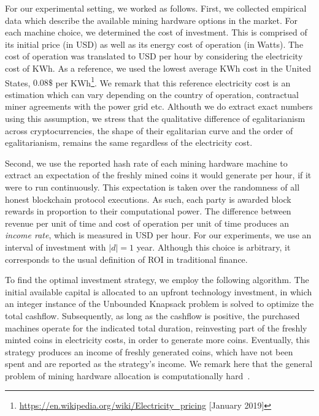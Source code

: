 For our experimental setting, we worked as follows. First, we collected
empirical data which describe the available mining hardware options in the
market. For each machine choice, we determined the cost of investment. This is
comprised of its initial price (in USD) as well as its energy cost of operation
(in Watts). The cost of operation was translated to USD per hour by considering
the electricity cost of KWh. As a reference, we used the lowest average KWh
cost in the United States, \ie $0.08\$$ per KWh\footnote{
\url{https://en.wikipedia.org/wiki/Electricity_pricing} [January
2019]}. We remark that this reference electricity cost is an estimation which
can vary depending on the country of operation, contractual miner agreements
with the power grid etc. Althouth we do extract exact numbers using this
assumption, we stress that the qualitative difference of egalitarianism across
cryptocurrencies, \ie the shape of their egalitarian curve and the order of
egalitarianism, remains the same regardless of the electricity cost.

Second, we use the reported hash rate of each mining hardware machine to
extract an expectation of the freshly mined coins it would generate per hour,
if it were to run continuously. This expectation is taken over the randomness
of all honest blockchain protocol executions. As such, each party is awarded
block rewards in proportion to their computational power. The difference
between revenue per unit of time and cost of operation per unit of time
produces an \emph{income rate}, which is measured in USD per hour.
For our experiments, we use an interval of investment with $|d| = 1$ year. Although
this choice is arbitrary, it corresponds to the usual definition of ROI in
traditional finance.

To find the optimal investment strategy, we employ the following algorithm. The
initial available capital is allocated to an upfront technology
investment, in which an integer instance of the Unbounded Knapsack problem
\cite{mathews1896partition} is solved to optimize the total cashflow.
Subsequently, as long as the cashflow is positive, the purchased machines
operate for the indicated total duration, reinvesting part of the freshly
minted coins in electricity costs, in order to generate more coins. Eventually,
this strategy produces an income of freshly generated coins, which have not
been spent and are reported as the strategy's income. We remark here that the
general problem of mining hardware allocation is computationally
hard~\cite{karp1972reducibility}.

